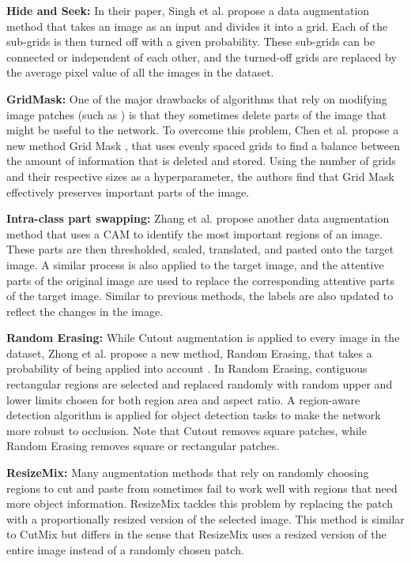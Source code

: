 \textbf{Hide and Seek: }
In their paper, Singh et al. \cite{singhHideandSeekDataAugmentation2018} propose a data augmentation method that takes an image as an input and divides it into a grid. Each of the sub-grids is then turned off with a given probability. These sub-grids can be connected or independent of each other, and the turned-off grids are replaced by the average pixel value of all the images in the dataset.

\textbf{GridMask: }
One of the major drawbacks of algorithms that rely on modifying image patches (such as \cite{singhHideandSeekDataAugmentation2018,devriesImprovedRegularizationConvolutional2017,zhongRandomErasingData2020}) is that they sometimes delete parts of the image that might be useful to the network. To overcome this problem, Chen et al. propose a new method Grid Mask \cite{chenGridMaskDataAugmentation2020}, that uses evenly spaced grids to find a balance between the amount of information that is deleted and stored. Using the number of grids and their respective sizes as a hyperparameter, the authors find that Grid Mask effectively preserves important parts of the image.

\textbf{Intra-class part swapping: }
Zhang et al. propose another data augmentation method that uses a CAM \cite{zhouLearningDeepFeatures2016} to identify the most important regions of an image. These parts are then thresholded, scaled, translated, and pasted onto the target image. A similar process is also applied to the target image, and the attentive parts of the original image are used to replace the corresponding attentive parts of the target image. Similar to previous methods, the labels are also updated to reflect the changes in the image.

\textbf{Random Erasing: }
While Cutout augmentation \cite{devriesImprovedRegularizationConvolutional2017} is applied to every image in the dataset, Zhong et al. propose a new method, Random Erasing, that takes a probability of being applied into account \cite{zhongRandomErasingData2020}. In Random Erasing, contiguous rectangular regions are selected and replaced randomly with random upper and lower limits chosen for both region area and aspect ratio. A region-aware detection algorithm is applied for object detection tasks to make the network more robust to occlusion. Note that Cutout removes square patches, while Random Erasing removes square or rectangular patches.

\textbf{ResizeMix: }
Many augmentation methods that rely on randomly choosing regions to cut and paste from sometimes fail to work well with regions that need more object information. ResizeMix \cite{qinResizeMixMixingData2020} tackles this problem by replacing the patch with a proportionally resized version of the selected image. This method is similar to CutMix \cite{yunCutMixRegularizationStrategy2019} but differs in the sense that ResizeMix uses a resized version of the entire image instead of a randomly chosen patch.

